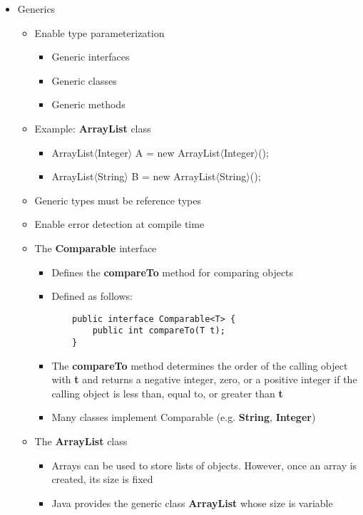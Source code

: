 \documentclass[11pt]{article}
\begin{document}
\begin{itemize}
	\item Generics
		\begin{itemize}
			\item Enable type parameterization
				\begin{itemize}
					\item Generic interfaces
					\item Generic classes
					\item Generic methods
				\end{itemize}
			\item Example: \textbf{ArrayList} class
				\begin{itemize}
					\item ArrayList$\langle$Integer$\rangle$ A = new ArrayList$\langle$Integer$\rangle$();
					\item ArrayList$\langle$String$\rangle$ B = new ArrayList$\langle$String$\rangle$();
				\end{itemize}
			\item Generic types must be reference types
			\item Enable error detection at compile time
			\item The \textbf{Comparable} interface
				\begin{itemize}
					\item Defines the \textbf{compareTo} method for comparing objects
					\item Defined as follows:\\[5pt]
\begin{minipage}{0.5\textwidth}
		\begin{Verbatim}
	public interface Comparable<T> {
		public int compareTo(T t);
	}
\end{Verbatim}
\end{minipage}
					\item The \textbf{compareTo} method determines the order of the calling object with \textbf{t} and returns a negative integer, zero, or a positive integer if the calling object is less than, equal to, or greater than \textbf{t}
					\item Many classes implement Comparable (e.g. \textbf{String}, \textbf{Integer})
				\end{itemize}
			\item The \textbf{ArrayList} class
				\begin{itemize}
					\item Arrays can be used to store lists of objects. However, once an
					array is created, its size is fixed
					\item Java provides the generic class \textbf{ArrayList} whose size is variable

\end{itemize}
\end{itemize}
\end{itemize}
\end{document}
